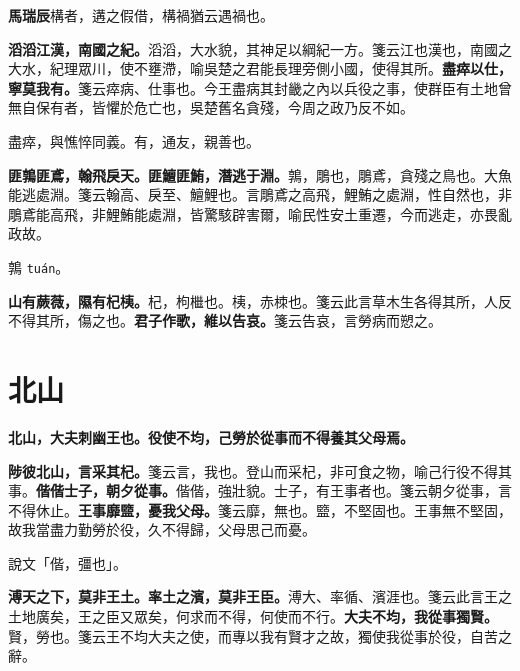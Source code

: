 \begin{quoting}\textbf{馬瑞辰}構者，遘之假借，構禍猶云遇禍也。\end{quoting}

\textbf{滔滔江漢，南國之紀。}{\footnotesize 滔滔，大水貌，其神足以綱紀一方。箋云江也漢也，南國之大水，紀理眾川，使不壅滯，喻吳楚之君能長理旁側小國，使得其所。}\textbf{盡瘁以仕，寧莫我有。}{\footnotesize 箋云瘁病、仕事也。今王盡病其封畿之內以兵役之事，使群臣有土地曾無自保有者，皆懼於危亡也，吳楚舊名貪殘，今周之政乃反不如。}

\begin{quoting}盡瘁，與憔悴同義。有，通友，親善也。\end{quoting}

\textbf{匪鶉匪鳶，翰飛戾天。匪鱣匪鮪，潛逃于淵。}{\footnotesize 鶉，鵰也，鵰鳶，貪殘之鳥也。大魚能逃處淵。箋云翰高、戾至、鱣鯉也。言鵰鳶之高飛，鯉鮪之處淵，性自然也，非鵰鳶能高飛，非鯉鮪能處淵，皆驚駭辟害爾，喻民性安土重遷，今而逃走，亦畏亂政故。}

\begin{quoting}鶉 \texttt{tuán}。\end{quoting}

\textbf{山有蕨薇，隰有杞桋。}{\footnotesize 杞，枸檵也。桋，赤栜也。箋云此言草木生各得其所，人反不得其所，傷之也。}\textbf{君子作歌，維以告哀。}{\footnotesize 箋云告哀，言勞病而愬之。}

\section{北山}


\textbf{北山，大夫刺幽王也。役使不均，己勞於從事而不得養其父母焉。}

\textbf{陟彼北山，言采其杞。}{\footnotesize 箋云言，我也。登山而采杞，非可食之物，喻己行役不得其事。}\textbf{偕偕士子，朝夕從事。}{\footnotesize 偕偕，強壯貌。士子，有王事者也。箋云朝夕從事，言不得休止。}\textbf{王事靡盬，憂我父母。}{\footnotesize 箋云靡，無也。盬，不堅固也。王事無不堅固，故我當盡力勤勞於役，久不得歸，父母思己而憂。}

\begin{quoting}說文「偕，彊也」。\end{quoting}

\textbf{溥天之下，莫非王土。率土之濱，莫非王臣。}{\footnotesize 溥大、率循、濱涯也。箋云此言王之土地廣矣，王之臣又眾矣，何求而不得，何使而不行。}\textbf{大夫不均，我從事獨賢。}{\footnotesize 賢，勞也。箋云王不均大夫之使，而專以我有賢才之故，獨使我從事於役，自苦之辭。}


